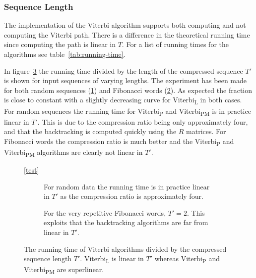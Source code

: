 \subsubsection{Sequence Length}

The implementation of the Viterbi algorithm supports both computing and not
computing the Viterbi path. There is a difference in the theoretical running
time since computing the path is linear in $T$. For a list of running times
for the algorithms see table~\ref{tab:running-time}.

In figure~\ref{fig:assymptotic_viterbi_T} the running time divided by the
length of the compressed sequence $T'$ is shown for input sequences of varying
lengths. The experiment has been made for both random sequences (\ref{fig:assymptotic_viterbi_T_a})
and Fibonacci words (\ref{fig:assymptotic_viterbi_T_b}). As expected the fraction is close to
constant with a slightly decreasing curve for Viterbi\textsubscript{L} in both
cases. For random sequences the running time for Viterbi\textsubscript{P} and
Viterbi\textsubscript{PM} is in practice linear in $T'$. This is due to
the compression ratio being only approximately four, and that the backtracking
is computed quickly using the $R$ matrices. For Fibonacci words the compression
ratio is much better and the Viterbi\textsubscript{P} and
Viterbi\textsubscript{PM} algorithms are clearly not linear in $T'$.

\begin{figure}
  \centering\ref{test}\\
  \begin{subfigure}[b]{0.5\textwidth}
    \centering 
    \captionsetup{margin=10pt}
    \caption{For random data the running time is in practice linear in $T'$ as
      the compression ratio is approximately four.}
    \label{fig:assymptotic_viterbi_T_a}
  \end{subfigure}\hspace{-5mm}%
  \begin{subfigure}[b]{0.5\textwidth}
    \centering 
    \captionsetup{margin=10pt}
    \caption{For the very repetitive Fibonacci words, $T' = 2$. This exploits
      that the backtracking algorithms are far from linear in $T'$.}
    \label{fig:assymptotic_viterbi_T_b}
  \end{subfigure}
  \caption{The running time of Viterbi algorithms divided by the compressed
    sequence length $T'$. Viterbi\textsubscript{L} is linear in $T'$ whereas
    Viterbi\textsubscript{P} and Viterbi\textsubscript{PM} are superlinear.}
  \label{fig:assymptotic_viterbi_T}
\end{figure}

